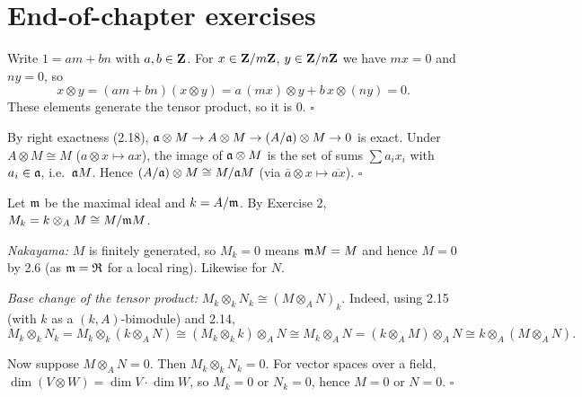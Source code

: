 \documentclass[11pt]{article}
\begin{document}
\section*{End-of-chapter exercises}

\pf
Write $1=am+bn$ with $a,b\in\mathbf Z$. For $x\in\mathbf Z/m\mathbf Z$, $y\in\mathbf Z/n\mathbf Z$ we have $mx=0$ and $ny=0$, so
\[
x\otimes y=(am+bn)(x\otimes y)=a\,(mx)\otimes y+b\,x\otimes(ny)=0.
\]
These elements generate the tensor product, so it is $0$. \hfill$\square$

\pf
By right exactness (2.18), $\mathfrak a\otimes M\to A\otimes M\to(A/\mathfrak a)\otimes M\to0$ is exact. Under $A\otimes M\cong M$ ($a\otimes x\mapsto ax$), the image of $\mathfrak a\otimes M$ is the set of sums $\sum a_ix_i$ with $a_i\in\mathfrak a$, i.e.\ $\mathfrak a M$. Hence $(A/\mathfrak a)\otimes M\cong M/\mathfrak a M$ (via $\bar a\otimes x\mapsto\overline{ax}$). \hfill$\square$

\pf
Let $\mathfrak m$ be the maximal ideal and $k=A/\mathfrak m$. By Exercise 2, $M_k=k\otimes_AM\cong M/\mathfrak m M$.

\emph{Nakayama:} $M$ is finitely generated, so $M_k=0$ means $\mathfrak m M=M$ and hence $M=0$ by 2.6 (as $\mathfrak m=\mathfrak R$ for a local ring). Likewise for $N$.

\emph{Base change of the tensor product:} $M_k\otimes_kN_k\cong(M\otimes_AN)_k$. Indeed, using 2.15 (with $k$ as a $(k,A)$-bimodule) and 2.14,
\[
M_k\otimes_kN_k=M_k\otimes_k(k\otimes_AN)\cong(M_k\otimes_kk)\otimes_AN\cong M_k\otimes_AN=(k\otimes_AM)\otimes_AN\cong k\otimes_A(M\otimes_AN).
\]

Now suppose $M\otimes_AN=0$. Then $M_k\otimes_kN_k=0$. For vector spaces over a field, $\dim(V\otimes W)=\dim V\cdot\dim W$, so $M_k=0$ or $N_k=0$, hence $M=0$ or $N=0$. \hfill$\square$
\end{document}
